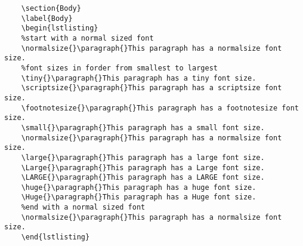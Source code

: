 \begin{verbatim}
    \section{Body}
    \label{Body}
    \begin{lstlisting}
    %start with a normal sized font
    \normalsize{}\paragraph{}This paragraph has a normalsize font size.
    %font sizes in forder from smallest to largest
    \tiny{}\paragraph{}This paragraph has a tiny font size.
    \scriptsize{}\paragraph{}This paragraph has a scriptsize font size.
    \footnotesize{}\paragraph{}This paragraph has a footnotesize font size.
    \small{}\paragraph{}This paragraph has a small font size.
    \normalsize{}\paragraph{}This paragraph has a normalsize font size.
    \large{}\paragraph{}This paragraph has a large font size.
    \Large{}\paragraph{}This paragraph has a Large font size.
    \LARGE{}\paragraph{}This paragraph has a LARGE font size.
    \huge{}\paragraph{}This paragraph has a huge font size.
    \Huge{}\paragraph{}This paragraph has a Huge font size.
    %end with a normal sized font
    \normalsize{}\paragraph{}This paragraph has a normalsize font size.
    \end{lstlisting}

\end{verbatim}
